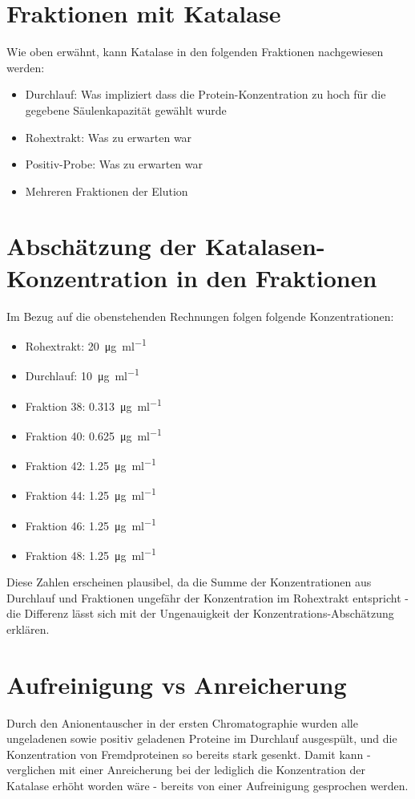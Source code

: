 \documentclass[a4paper,german]{scrreprt}
\begin{document}
\section{Fraktionen mit Katalase}

Wie oben erwähnt, kann Katalase in den folgenden Fraktionen nachgewiesen
werden:

\begin{itemize}
	\item Durchlauf: Was impliziert dass die Protein-Konzentration zu hoch
		für die gegebene Säulenkapazität gewählt wurde
	\item Rohextrakt: Was zu erwarten war
	\item Positiv-Probe: Was zu erwarten war
	\item Mehreren Fraktionen der Elution
\end{itemize}

\section{Abschätzung der Katalasen-Konzentration in den Fraktionen}

Im Bezug auf die obenstehenden Rechnungen folgen folgende Konzentrationen:
\begin{itemize}
	\item Rohextrakt: \SI{20}{\ug \per \ml}
	\item Durchlauf: \SI{10}{\ug \per \ml}
	\item Fraktion 38: \SI{0.313}{\ug \per \ml}
	\item Fraktion 40: \SI{0.625}{\ug \per \ml}
	\item Fraktion 42: \SI{1.25}{\ug \per \ml}
	\item Fraktion 44: \SI{1.25}{\ug \per \ml}
	\item Fraktion 46: \SI{1.25}{\ug \per \ml}
	\item Fraktion 48: \SI{1.25}{\ug \per \ml}
\end{itemize}

Diese Zahlen erscheinen plausibel, da die Summe der Konzentrationen aus
Durchlauf und Fraktionen ungefähr der Konzentration im Rohextrakt entspricht -
die Differenz lässt sich mit der Ungenauigkeit der
Konzentrations-Abschätzung erklären.

\section{Aufreinigung vs Anreicherung}

Durch den Anionentauscher in der ersten Chromatographie wurden alle ungeladenen
sowie positiv geladenen Proteine im Durchlauf ausgespült, und die Konzentration
von Fremdproteinen so bereits stark gesenkt. Damit kann - verglichen mit einer
Anreicherung bei der lediglich die Konzentration der Katalase erhöht worden
wäre - bereits von einer Aufreinigung gesprochen werden.
\end{document}
